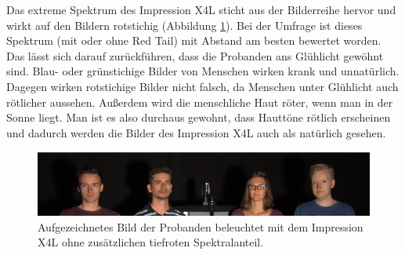 Das extreme Spektrum des Impression X4L sticht aus der Bilderreihe hervor und wirkt auf den Bildern rotstichig (Abbildung \ref{b_umfrageglp}). Bei der Umfrage ist dieses Spektrum (mit oder ohne \glqq Red Tail\grqq) mit Abstand am besten bewertet worden. Das lässt sich darauf zurückführen, dass die Probanden ans Glühlicht gewöhnt sind. Blau- oder grünstichige Bilder von Menschen wirken krank und unnatürlich. Dagegen wirken rotstichige Bilder nicht falsch, da Menschen unter Glühlicht auch rötlicher aussehen. Außerdem wird die menschliche Haut röter, wenn man in der Sonne liegt. Man ist es also durchaus gewohnt, dass Hauttöne rötlich erscheinen und dadurch werden die Bilder des Impression X4L auch als natürlich gesehen. 

\begin{figure}[H]     %
\centering
\includegraphics[width=1.0\textwidth]{bilder/umfrageglp} 
\caption {Aufgezeichnetes Bild der Probanden beleuchtet mit dem Impression X4L ohne zusätzlichen tiefroten Spektralanteil.} \label{b_umfrageglp}
\end{figure}

